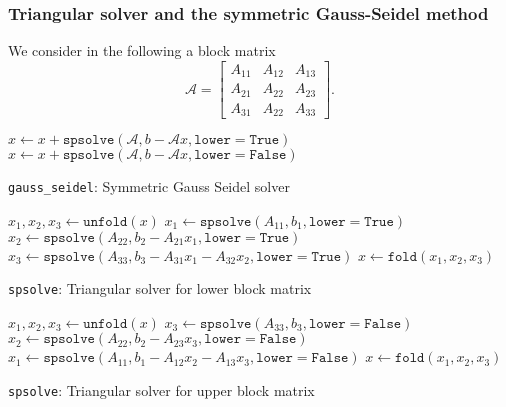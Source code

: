 \subsubsection{Triangular solver and the symmetric Gauss-Seidel method}
We consider in the following a block matrix 
%
\begin{equation} %
\mathcal{A} =\begin{bmatrix}
 A_{11} & A_{12} & A_{13}  \\
 A_{21} & A_{22} & A_{23}  \\
 A_{31} & A_{22} & A_{33}  
\end{bmatrix}.
\end{equation}
%

\begin{algorithm}[H]
\DontPrintSemicolon
\SetAlgoLined
{}
\BlankLine

   {
    $x \gets x + \texttt{spsolve}(\mathcal{A}, b - \mathcal{A} x, \texttt{lower}=\texttt{True})$ \; 
  }
   {
    $x \gets x + \texttt{spsolve}(\mathcal{A}, b - \mathcal{A} x, \texttt{lower}=\texttt{False})$ \; 
  }

\caption{\texttt{gauss\_seidel}: Symmetric Gauss Seidel solver}
\end{algorithm} 

\begin{algorithm}[H]
\DontPrintSemicolon
\SetAlgoLined
{}
\BlankLine

  $x_1, x_2, x_3 \gets \texttt{unfold}(x)$ \; 
  $x_1 \gets \texttt{spsolve}(A_{11}, b_1, \texttt{lower}=\texttt{True})$                                    
  $x_2 \gets \texttt{spsolve}(A_{22}, b_2 - A_{21} x_1, \texttt{lower}=\texttt{True})$                       
  $x_3 \gets \texttt{spsolve}(A_{33}, b_3 - A_{31} x_1 - A_{32} x_2, \texttt{lower}=\texttt{True})$          
  $x \gets \texttt{fold}(x_1, x_2, x_3)$ \; 

\caption{\texttt{spsolve}: Triangular solver for lower block matrix}
\end{algorithm} 

\begin{algorithm}[H]
\DontPrintSemicolon
\SetAlgoLined
{}
\BlankLine

  $x_1, x_2, x_3 \gets \texttt{unfold}(x)$ \; 
  $x_3 \gets \texttt{spsolve}(A_{33}, b_3, \texttt{lower}=\texttt{False})$                                    
  $x_2 \gets \texttt{spsolve}(A_{22}, b_2 - A_{23} x_3, \texttt{lower}=\texttt{False})$                       
  $x_1 \gets \texttt{spsolve}(A_{11}, b_1 - A_{12} x_2 - A_{13} x_3, \texttt{lower}=\texttt{False})$          
  $x \gets \texttt{fold}(x_1, x_2, x_3)$ \; 

\caption{\texttt{spsolve}: Triangular solver for upper block matrix}
\end{algorithm} 

